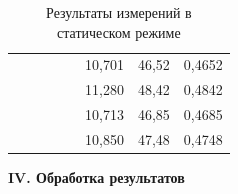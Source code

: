 \begin{enumerate}
\begin{table}[h!]
\begin{tabular}{ccccc|lll|}
				&                                               &                                &  &  & \multicolumn{1}{l|}{10,701}                    & \multicolumn{1}{l|}{46,52}                    & 0,4652                         \\ \cline{6-8} 
				&                                               &                                &  &  & \multicolumn{1}{l|}{11,280}                     & \multicolumn{1}{l|}{48,42}                    & 0,4842                         \\ \cline{6-8} 
				&                                               &                                &  &  & \multicolumn{1}{l|}{10,713}                    & \multicolumn{1}{l|}{46,85}                    & 0,4685                         \\ \cline{6-8} 
				&                                               &                                &  &  & \multicolumn{1}{l|}{10,850}                     & \multicolumn{1}{l|}{47,48}                    & 0,4748                         \\ \cline{6-8} 
			\end{tabular}
			\caption{Результаты измерений в статическом режиме}
		\end{table}
		
	\end{enumerate}

	\begin{center}
		\textbf{IV. Обработка результатов}
	\end{center}


